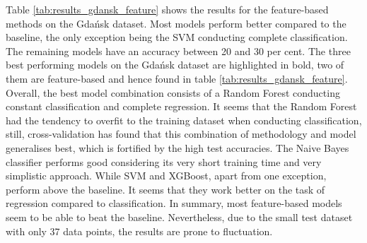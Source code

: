 \documentclass[11pt]{scrartcl}
\begin{document}
Table \ref{tab:results_gdansk_feature} shows the results for the feature-based methods on the Gdańsk dataset. Most models perform better compared to the baseline, the only exception being the SVM conducting complete classification. The remaining models have an accuracy between 20 and 30 per cent. The three best performing models on the Gdańsk dataset are highlighted in bold, two of them are feature-based and hence found in table \ref{tab:results_gdansk_feature}. Overall, the best model combination consists of a Random Forest conducting constant classification and complete regression. It seems that the Random Forest had the tendency to overfit to the training dataset when conducting classification, still, cross-validation has found that this combination of methodology and model generalises best, which is fortified by the high test accuracies. The Naive Bayes classifier performs good considering its very short training time and very simplistic approach. While SVM and XGBoost, apart from one exception, perform above the baseline. It seems that they work better on the task of regression compared to classification. In summary, most feature-based models seem  to be able to beat the baseline. Nevertheless, due to the small test dataset with only 37 data points, the results are prone to fluctuation.
\end{document}
